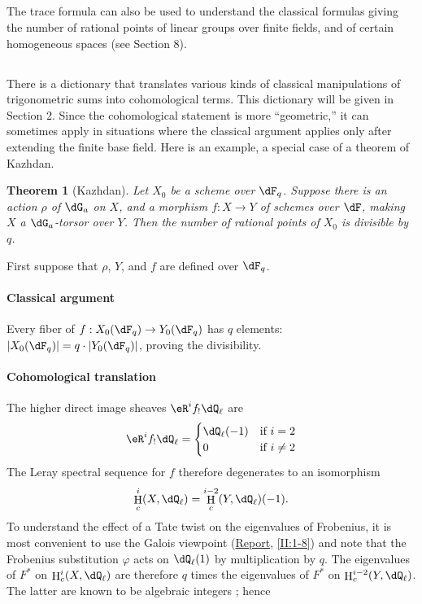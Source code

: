 \documentclass[12pt,oneside,english]{smfbook}
\DeclareMathOperator{\h}{H}
\newtheorem{theorem_}[subsection]{Theorem}
\begin{document}
\subsection{}\label{VI:1-11}

The trace formula can also be used to understand the classical formulas giving the number of rational points of linear groups over finite fields, and of certain homogeneous spaces (see Section 8).

\subsection{}\label{VI:1-12}

There is a dictionary that translates various kinds of classical manipulations of trigonometric sums into cohomological terms. This dictionary will be given in Section 2. Since the cohomological statement is more ``geometric,'' it can sometimes apply in situations where the classical argument applies only after extending the finite base field. Here is an example, a special case of a theorem of Kazhdan.

\begin{theorem_}[Kazhdan]\label{VI:1-13}
Let $X_0$ be a scheme over $\dF_q$. Suppose there is an action $\rho$ of $\dG_a$ on $X$, and a morphism $f:X\to Y$ of schemes over $\dF$, making $X$ a $\dG_a$-torsor over $Y$. Then the number of rational points of $X_0$ is divisible by $q$.
\end{theorem_}

First suppose that $\rho$, $Y$, and $f$ are defined over $\dF_q$.

\paragraph{Classical argument}
Every fiber of $f:X_0(\dF_q)\to Y_0(\dF_q)$ has $q$ elements: $|X_0(\dF_q)|=q\cdot|Y_0(\dF_q)|$, proving the divisibility.

\paragraph{Cohomological translation}
The higher direct image sheaves $\eR^if_!\dQ_\ell$ are
\[
  \eR^i f_!\dQ_\ell = \begin{cases}
                       \dQ_\ell(-1) & \text{if $i=2$} \\
                       0            & \text{if $i\ne2$}
                     \end{cases}
\]
The Leray spectral sequence for $f$ therefore degenerates to an isomorphism
\[
  \h_c^i(X,\dQ_\ell) = \h_c^{i-2}(Y,\dQ_\ell)(-1) \text{.}
\]
To understand the effect of a Tate twist on the eigenvalues of Frobenius, it is most convenient to use the Galois viewpoint (\hyperref[II]{Report}, \ref{II:1-8}) and note that the Frobenius substitution $\varphi$ acts on $\dQ_\ell(1)$ by multiplication by $q$. The eigenvalues of $F^\ast$ on $\h_c^i(X,\dQ_\ell)$ are therefore $q$ times the eigenvalues of $F^\ast$ on $\h_c^{i-2}(Y,\dQ_\ell)$. The latter are known to be algebraic integers \cite[XXI 5.2.2]{sga7}; hence
\end{document}
